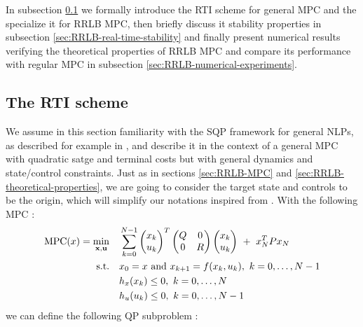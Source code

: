 \documentclass[12pt]{article}
\begin{document}
In subsection \ref{sec:RTI-scheme} we formally introduce the RTI scheme for general MPC and the specialize it for RRLB MPC, then briefly discuss it stability properties in subsection \ref{sec:RRLB-real-time-stability} and finally present numerical results verifying the theoretical properties of RRLB MPC and compare its performance with  regular MPC in subsection \ref{sec:RRLB-numerical-experiments}.

\subsection{The RTI scheme}\label{sec:RTI-scheme}

We assume in this section familiarity with the SQP framework for general NLPs, as described for example in \cite{nocedal-wright}, and describe it in the context of a general MPC with quadratic satge and terminal costs but with general dynamics and state/control constraints.
Just as in sections \ref{sec:RRLB-MPC} and \ref{sec:RRLB-theoretical-properties}, we are going to consider the target state and controls to be the origin, which will simplify our notations inspired from \cite{mpc-rti}.
With the following MPC :
\begin{align*}
	\mathrm{MPC}(x)=\underset{\bf{x},\bf{u}}{\min} &\quad \sum_{k=0}^{N-1}\begin{pmatrix}x_k\\u_k\end{pmatrix}^T\begin{pmatrix}
		Q & 0\\
		0 & R\\
	\end{pmatrix}\begin{pmatrix}x_k\\u_k\end{pmatrix}~+~x_N^TPx_N\\
	\text{s.t.} &\quad x_0=x\text{ and }x_{k+1}=f(x_k,u_k),~k=0,\dots,N-1\\
	&\quad h_x(x_k)\leq 0,~k=0,\dots,N\\
	&\quad h_u(u_k)\leq 0,~k=0,\dots,N-1
\end{align*}
we can define the following QP subproblem :
\end{document}
